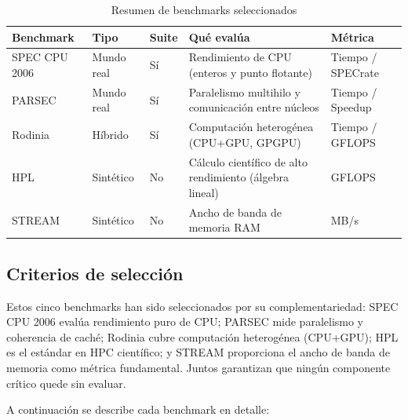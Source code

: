 \documentclass[11pt,a4paper]{article}
\begin{document}
\begin{table}[H]
\centering
\caption{Resumen de benchmarks seleccionados}
\label{tab:benchmarks_resumen}
\begin{tabularx}{\textwidth}{|l|l|l|L|l|}
\hline
{}
\textbf{Benchmark} & \textbf{Tipo} & \textbf{Suite} & \textbf{Qué evalúa} & \textbf{Métrica} \\
\hline
SPEC CPU 2006 & Mundo real & Sí & Rendimiento de CPU (enteros y punto flotante) & Tiempo / SPECrate \\
\hline
PARSEC & Mundo real & Sí & Paralelismo multihilo y comunicación entre núcleos & Tiempo / Speedup \\
\hline
Rodinia & Híbrido & Sí & Computación heterogénea (CPU+GPU, GPGPU) & Tiempo / GFLOPS \\
\hline
HPL & Sintético & No & Cálculo científico de alto rendimiento (álgebra lineal) & GFLOPS \\
\hline
STREAM & Sintético & No & Ancho de banda de memoria RAM & MB/s \\
\hline
\end{tabularx}
\end{table}

\subsection{Criterios de selección}

Estos cinco benchmarks han sido seleccionados por su complementariedad: SPEC CPU 2006 evalúa rendimiento puro de CPU; PARSEC mide paralelismo y coherencia de caché; Rodinia cubre computación heterogénea (CPU+GPU); HPL es el 
estándar en HPC científico; y STREAM proporciona el ancho de banda de memoria como métrica fundamental. Juntos garantizan que ningún componente crítico quede sin evaluar.

A continuación se describe cada benchmark en detalle:
\end{document}
